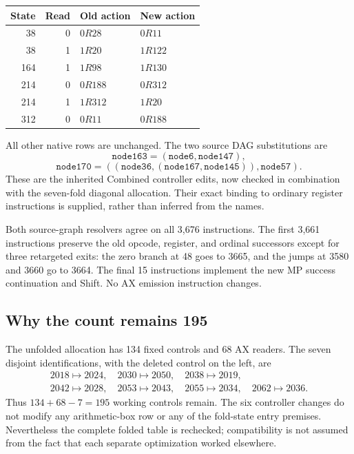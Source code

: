 \documentclass[11pt,letterpaper]{article}
\begin{document}
\begin{center}
\begin{tabular}{@{}rrll@{}}
\toprule
State&Read&Old action&New action\\\midrule
38&0&$0R28$&$0R11$\\
38&1&$1R20$&$1R122$\\
164&1&$1R98$&$1R130$\\
214&0&$0R188$&$0R312$\\
214&1&$1R312$&$1R20$\\
312&0&$0R11$&$0R188$\\
\bottomrule
\end{tabular}
\end{center}

All other native rows are unchanged. The two source DAG substitutions are
\[
 \texttt{node163}=(\texttt{node6},\texttt{node147}),
\]
\[
 \texttt{node170}=((\texttt{node36},(\texttt{node167},\texttt{node145})),
                         \texttt{node57}).
\]
These are the inherited Combined controller edits, now checked in combination
with the seven-fold diagonal allocation. Their exact binding to ordinary
register instructions is supplied, rather than inferred from the names.

Both source-graph resolvers agree on all 3,676 instructions. The first 3,661
instructions preserve the old opcode, register, and ordinal successors except
for three retargeted exits: the zero branch at 48 goes to 3665, and the jumps
at 3580 and 3660 go to 3664. The final 15 instructions implement the new MP
success continuation and Shift. No AX emission instruction changes.

\subsection{Why the count remains 195}

The unfolded allocation has 134 fixed controls and 68 AX readers. The seven
disjoint identifications, with the deleted control on the left, are
\[
\begin{gathered}
2018\mapsto2024,\quad2030\mapsto2050,\quad2038\mapsto2019,\\
2042\mapsto2028,\quad2053\mapsto2043,\quad2055\mapsto2034,
\quad2062\mapsto2036.
\end{gathered}
\]
Thus $134+68-7=195$ working controls remain. The six controller changes do
not modify any arithmetic-box row or any of the fold-state entry premises.
Nevertheless the complete folded table is rechecked; compatibility is not
assumed from the fact that each separate optimization worked elsewhere.
\end{document}
